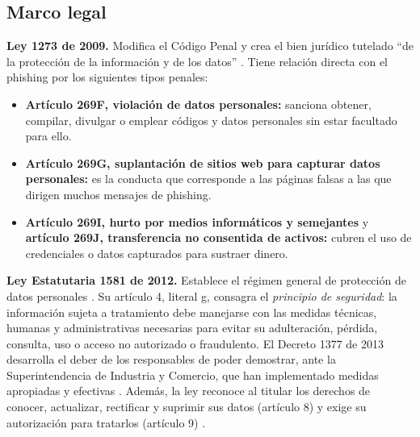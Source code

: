 \documentclass[journal,onecolumn,12pt,draftclsnofoot]{IEEEtran}
\begin{document}
\subsection{Marco legal}\label{sec:marco}

\textbf{Ley 1273 de 2009.} Modifica el Código Penal y crea el bien jurídico tutelado ``de la protección de la información y de los datos'' \cite{ley1273}. Tiene relación directa con el phishing por los siguientes tipos penales:

\begin{itemize}
  \item \textbf{Artículo 269F, violación de datos personales:} sanciona obtener, compilar, divulgar o emplear códigos y datos personales sin estar facultado para ello.
  \item \textbf{Artículo 269G, suplantación de sitios web para capturar datos personales:} es la conducta que corresponde a las páginas falsas a las que dirigen muchos mensajes de phishing.
  \item \textbf{Artículo 269I, hurto por medios informáticos y semejantes} y \textbf{artículo 269J, transferencia no consentida de activos:} cubren el uso de credenciales o datos capturados para sustraer dinero.
\end{itemize}

\textbf{Ley Estatutaria 1581 de 2012.} Establece el régimen general de protección de datos personales \cite{ley1581}. Su artículo 4, literal g, consagra el \emph{principio de seguridad}: la información sujeta a tratamiento debe manejarse con las medidas técnicas, humanas y administrativas necesarias para evitar su adulteración, pérdida, consulta, uso o acceso no autorizado o fraudulento. El Decreto 1377 de 2013 desarrolla el deber de los responsables de poder demostrar, ante la Superintendencia de Industria y Comercio, que han implementado medidas apropiadas y efectivas \cite{decreto1377}. Además, la ley reconoce al titular los derechos de conocer, actualizar, rectificar y suprimir sus datos (artículo 8) y exige su autorización para tratarlos (artículo 9) \cite{ley1581}.
\end{document}
